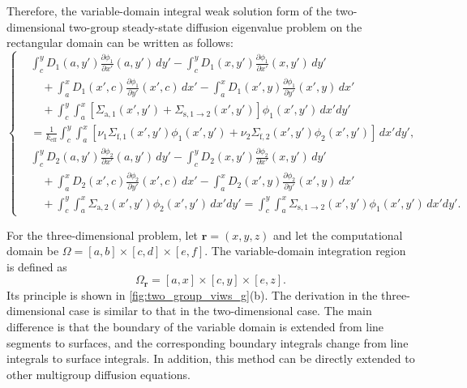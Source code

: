 \documentclass[final,3p,times,sort&compress]{elsarticle}
\begin{document}
Therefore, the variable-domain integral weak solution form of the two-dimensional two-group steady-state diffusion eigenvalue problem on the rectangular domain can be written as follows:
\begin{equation}
\left\{
\begin{aligned}
    &
    \int_{c}^{y}
    D_1(a,y')
    \frac{\partial \phi_1}{\partial x'}(a,y')
    \,dy'
    -
    \int_{c}^{y}
    D_1(x,y')
    \frac{\partial \phi_1}{\partial x'}(x,y')
    \,dy'
    \\
    &\quad
    +
    \int_{a}^{x}
    D_1(x',c)
    \frac{\partial \phi_1}{\partial y'}(x',c)
    \,dx'
    -
    \int_{a}^{x}
    D_1(x',y)
    \frac{\partial \phi_1}{\partial y'}(x',y)
    \,dx'
    \\
    &\quad
    +
    \int_{c}^{y}
    \int_{a}^{x}
    \left[
    \Sigma_{\mathrm a,1}(x',y')
    +
    \Sigma_{\mathrm s,1\rightarrow2}(x',y')
    \right]
    \phi_1(x',y')
    \,dx'dy'
    \\
    &=
    \frac{1}{k_{\mathrm{eff}}}
    \int_{c}^{y}
    \int_{a}^{x}
    \left[
    \nu_1\Sigma_{\mathrm f,1}(x',y')\phi_1(x',y')
    +
    \nu_2\Sigma_{\mathrm f,2}(x',y')\phi_2(x',y')
    \right]
    \,dx'dy',
    \\[0.8em]
    &
    \int_{c}^{y}
    D_2(a,y')
    \frac{\partial \phi_2}{\partial x'}(a,y')
    \,dy'
    -
    \int_{c}^{y}
    D_2(x,y')
    \frac{\partial \phi_2}{\partial x'}(x,y')
    \,dy'
    \\
    &\quad
    +
    \int_{a}^{x}
    D_2(x',c)
    \frac{\partial \phi_2}{\partial y'}(x',c)
    \,dx'
    -
    \int_{a}^{x}
    D_2(x',y)
    \frac{\partial \phi_2}{\partial y'}(x',y)
    \,dx'
    \\
    &\quad
    +
    \int_{c}^{y}
    \int_{a}^{x}
    \Sigma_{\mathrm a,2}(x',y')
    \phi_2(x',y')
    \,dx'dy'
    =
    \int_{c}^{y}
    \int_{a}^{x}
    \Sigma_{\mathrm s,1\rightarrow2}(x',y')
    \phi_1(x',y')
    \,dx'dy' .
\end{aligned}
\right.
\label{eq:two_group_variable_weak_form}
\end{equation}

For the three-dimensional problem, let $\boldsymbol r=(x,y,z)$ and let the computational domain be $\Omega=[a,b]\times[c,d]\times[e,f]$. The variable-domain integration region is defined as
\begin{equation}
\Omega_{\boldsymbol r} = [a,x]\times[c,y]\times[e,z].
\label{eq:two_group_variable_domain_3d}
\end{equation}
Its principle is shown in \cref{fig:two_group_viws_g}(b). The derivation in the three-dimensional case is similar to that in the two-dimensional case. The main difference is that the boundary of the variable domain is extended from line segments to surfaces, and the corresponding boundary integrals change from line integrals to surface integrals. In addition, this method can be directly extended to other multigroup diffusion equations.
\end{document}
